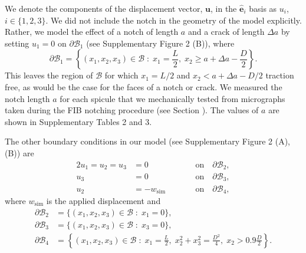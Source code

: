 \documentclass[12pt,onecolumn]{article}
\makeatletter
\DeclareRobustCommand*{\nameref}[1]{%
      \emph{\myorg@nameref{#1}}%
    }%
\newcommand{\ei}{\hat{\mathbf{e}}_i}
\makeatother
\begin{document}
\begin{bibunit}
We denote the components of the displacement vector, $\bm{u}$, in the $\ei$ basis as $u_i$, $i \in \{1,2,3\}$. We did not include the notch in the geometry of the model explicitly. Rather, we model the effect of a notch of length $a$ and a crack of length $\Delta a$ by setting $u_1=0$ on $\partial \mathcal{B}_1$ (see Supplementary Figure 2 (B)), where
\begin{equation}
\label{eq:BC1}
    \partial \mathcal{B}_1=\left\{(x_1,x_2,x_3) \in \mathcal{B} \; : \; x_1=\frac{L}{2}, \; x_2 \geq a+\Delta a-\frac{D}{2}\right\}.
\end{equation}
%
This leaves the region of $\mathcal{B}$ for which $x_1=L/2$ and $x_2 < a+\Delta a-D/2$ traction free, as would be the case for the faces of a notch or crack. We measured the notch length $a$ for each spicule that we mechanically tested from micrographs taken during the FIB notching procedure (see Section \nameref{sec:res}). The values of $a$ are shown in Supplementary Tables 2 and 3.

The other boundary conditions in our model (see Supplementary Figure 2 (A), (B)) are
%
\begin{alignat}{2}
    u_1=u_2=u_3&=0 \qquad&&\text{on}\quad \partial \mathcal{B}_2, \label{eq:BC2}\\
    u_3&=0 \qquad&&\text{on}\quad \partial \mathcal{B}_3,\label{eq:BC3}\\
    u_2&=-w_\mathrm{sim} \qquad&&\text{on}\quad \partial \mathcal{B}_4,\label{eq:BC4}
\end{alignat}
%
where $w_\mathrm{sim}$ is the applied displacement and
%
\begin{align}
    \partial\mathcal{B}_2&=\{(x_1,x_2,x_3) \in \mathcal{B} \; : \; x_1=0\},\\
    \partial\mathcal{B}_3&=\{(x_1,x_2,x_3) \in \mathcal{B} \; : \; x_3=0\},\\
    \partial\mathcal{B}_4&=\left\{(x_1,x_2,x_3) \in \mathcal{B} \; : \; x_1=\frac{L}{2}, \; x_2^2+x_3^2=\frac{D^2}{4}, \; x_2 >0.9 \frac{D}{2}\right\}.
\end{align}



\end{bibunit}
\end{document}
